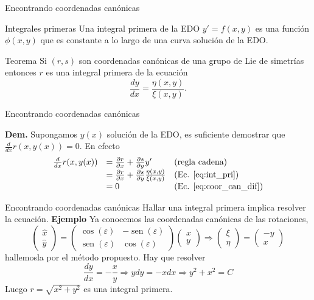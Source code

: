 \documentclass[handout,hyperref={colorlinks=true}]{beamer}
\renewcommand{\epsilon}{\varepsilon}
\DeclareMathOperator{\sen}{sen}
\newcommand{\nl}{\onslide<+-> }
\begin{document}
\begin{frame}{Encontrando coordenadas canónicas}

\nl \begin{block}{Integrales primeras}
Una integral primera de la EDO $y'=f(x,y)$ es una función $\phi(x,y)$ que es constante a lo largo de una curva solución de la EDO. 
\end{block}

\nl \begin{block}{Teorema} Si $(r,s)$ son coordenadas canónicas de una grupo de Lie de simetrías entonces $r$ es una integral primera de la ecuación
\begin{equation}\label{eq:int_pri} \frac{dy}{dx}=\frac{\eta(x,y)}{\xi(x,y)}.
\end{equation}
\end{block}


\end{frame}


\begin{frame}{Encontrando coordenadas canónicas}

\textbf{Dem.} Supongamos $y(x)$ solución de la EDO, es suficiente demostrar que $\frac{d}{dx}r(x,y(x))=0$. En efecto
\[
\begin{array}{lll}
 \frac{d}{dx}r(x,y(x)) &=\frac{\partial r}{\partial x}+\frac{\partial s}{\partial y}y' &\text{(regla cadena)}\\
&=\frac{\partial r}{\partial x}+\frac{\partial s}{\partial y}\frac{\eta(x,y)}{\xi(x,y)}& \text{(Ec. \eqref{eq:int_pri})}\\
&=0 & \text{(Ec. \eqref{eq:coor_can_dif})}\\
\end{array}
\]
\end{frame}




\begin{frame}{Encontrando coordenadas canónicas}
Hallar una integral primera implica resolver la ecuación.
\textbf{Ejemplo} Ya conocemos las coordenadas canónicas de las rotaciones, 
\[
 \begin{pmatrix} \hat{x}\\ \hat{y}
\end{pmatrix}=\begin{pmatrix} \cos(\epsilon) & -\sen(\epsilon)
\\ \sen(\epsilon) & \cos(\epsilon)
\end{pmatrix} \begin{pmatrix} x\\ y
\end{pmatrix}\Rightarrow  \begin{pmatrix} \xi\\ \eta
\end{pmatrix}= \begin{pmatrix} -y\\ x
\end{pmatrix}
\]
hallemosla por el método propuesto. Hay que resolver 
\[\frac{dy}{dx}=-\frac{x}{y}\Rightarrow ydy=-xdx\Rightarrow y^2+x^2=C\]
Luego $r=\sqrt{x^2+y^2}$ es una integral primera. 


\end{frame}
\end{document}

